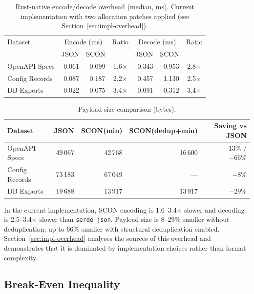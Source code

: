 \documentclass[11pt, a4paper]{article}
\begin{document}
\begin{table}[ht]
\centering
\caption{Rust-native encode/decode overhead (median, ms). Current
         implementation with two allocation patches applied
         (see Section~\ref{sec:impl-overhead}).}
\label{tab:rust-overhead}
\begin{tabular}{l rr c rr c}
\toprule
Dataset & \multicolumn{2}{c}{Encode (ms)} & Ratio
        & \multicolumn{2}{c}{Decode (ms)} & Ratio \\
        & JSON & SCON & & JSON & SCON & \\
\midrule
OpenAPI Specs   & 0.061 & 0.099 & 1.6$\times$ & 0.343 & 0.953 & 2.8$\times$ \\
Config Records  & 0.087 & 0.187 & 2.2$\times$ & 0.457 & 1.130 & 2.5$\times$ \\
DB Exports      & 0.022 & 0.075 & 3.4$\times$ & 0.091 & 0.312 & 3.4$\times$ \\
\bottomrule
\end{tabular}
\end{table}

\begin{table}[ht]
\centering
\caption{Payload size comparison (bytes).}
\label{tab:payload-size}
\begin{tabular}{l rrr r}
\toprule
Dataset & JSON & SCON(min) & SCON(dedup+min) & Saving vs JSON \\
\midrule
OpenAPI Specs   & 49\,067 & 42\,768 & 16\,600 & $-13\%$ / $-66\%$ \\
Config Records  & 73\,183 & 67\,049 & --- & $-8\%$ \\
DB Exports      & 19\,688 & 13\,917 & 13\,917 & $-29\%$ \\
\bottomrule
\end{tabular}
\end{table}

\noindent In the current implementation, SCON encoding is 1.6--3.4$\times$ slower and
decoding is 2.5--3.4$\times$ slower than \texttt{serde\_json}. Payload size is
8--29\% smaller without deduplication; up to 66\% smaller with structural
deduplication enabled. Section~\ref{sec:impl-overhead} analyses the sources
of this overhead and demonstrates that it is dominated by implementation
choices rather than format complexity.

\subsection{Break-Even Inequality}
\label{sec:breakeven}
\end{document}
